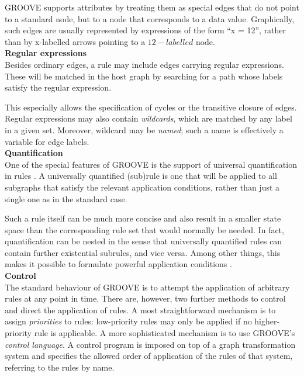GROOVE supports attributes by treating them as special edges that do not point to a standard node, but to a node that corresponds to a data value. Graphically, such edges are usually represented by expressions of the form \enquote{x = 12}, rather than by x-labelled arrows pointing to a $12-labelled$ node.\\ 
\textbf{Regular expressions}\\
Besides ordinary edges, a rule may include edges carrying regular expressions. These will be matched in the host graph by searching for a path whose labels satisfy the regular expression. 

This especially allows the specification of cycles or the transitive closure of edges. Regular expressions may also contain \emph{wildcards}, which are matched by any label in a given set. Moreover, wildcard may be \emph{named}; such a name is effectively a variable for edge labels.\\ 
\textbf{Quantification}\\ 
One of the special features of GROOVE is the support of universal quantification in rules \cite{rensink2009repotting}. A universally quantified (sub)rule is one that will be applied to all subgraphs that satisfy the relevant application conditions, rather than just a single one as in the standard case. 

Such a rule itself can be much more concise and also result in a smaller state space than the corresponding rule set that would normally be needed. In fact, quantification can be nested in the sense that universally quantified rules can contain further existential subrules, and vice versa. Among other things, this makes it possible to formulate powerful application conditions \cite{rensink2004representing}.\\ 
\textbf{Control}\\ 
The standard behaviour of GROOVE is to attempt the application of arbitrary rules at any point in time. There are, however, two further methods to control and direct the application of rules. A most straightforward mechanism is to assign \emph{priorities} to rules: low-priority rules may only be applied if no higher-priority rule is applicable. A more sophisticated mechanism is to use GROOVE’s \emph{control language}.
A control program is imposed on top of a graph transformation system and specifies the allowed order of application of the rules of that system, referring to the rules by name. 

